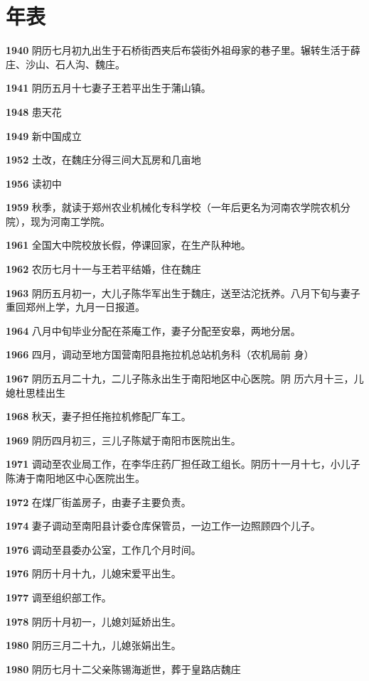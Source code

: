 \chapter{年表}

\textbf{1940} 阴历七月初九出生于石桥街西夹后布袋街外祖母家的巷子里。辗转生活于薛庄、沙山、石人沟、魏庄。

\textbf{1941} 阴历五月十七妻子王若平出生于蒲山镇。

\textbf{1948} 患天花

\textbf{1949} 新中国成立

\textbf{1952} 土改，在魏庄分得三间大瓦房和几亩地

\textbf{1956} 读初中

\textbf{1959} 秋季，就读于郑州农业机械化专科学校（一年后更名为河南农学院农机分院），现为河南工学院。

\textbf{1961} 全国大中院校放长假，停课回家，在生产队种地。

\textbf{1962} 农历七月十一与王若平结婚，住在魏庄

\textbf{1963} 阴历五月初一，大儿子陈华军出生于魏庄，送至沽沱抚养。八月下旬与妻子重回郑州上学，九月一日报道。

\textbf{1964} 八月中旬毕业分配在茶庵工作，妻子分配至安皋，两地分居。

\textbf{1966} 四月，调动至地方国营南阳县拖拉机总站机务科（农机局前 身）

\textbf{1967} 阴历五月二十九，二儿子陈永出生于南阳地区中心医院。阴 历六月十三，儿媳杜思桂出生

\textbf{1968} 秋天，妻子担任拖拉机修配厂车工。

\textbf{1969} 阴历四月初三，三儿子陈斌于南阳市医院出生。

\textbf{1971} 调动至农业局工作，在李华庄药厂担任政工组长。阴历十一月十七，小儿子陈涛于南阳地区中心医院出生。

\textbf{1972} 在煤厂街盖房子，由妻子主要负责。

\textbf{1974} 妻子调动至南阳县计委仓库保管员，一边工作一边照顾四个儿子。

\textbf{1976} 调动至县委办公室，工作几个月时间。

\textbf{1976} 阴历十月十九，儿媳宋爱平出生。

\textbf{1977} 调至组织部工作。

\textbf{1978} 阴历十月初一，儿媳刘延娇出生。

\textbf{1980} 阴历三月二十九，儿媳张娟出生。

\textbf{1980} 阴历七月十二父亲陈锡海逝世，葬于皇路店魏庄

